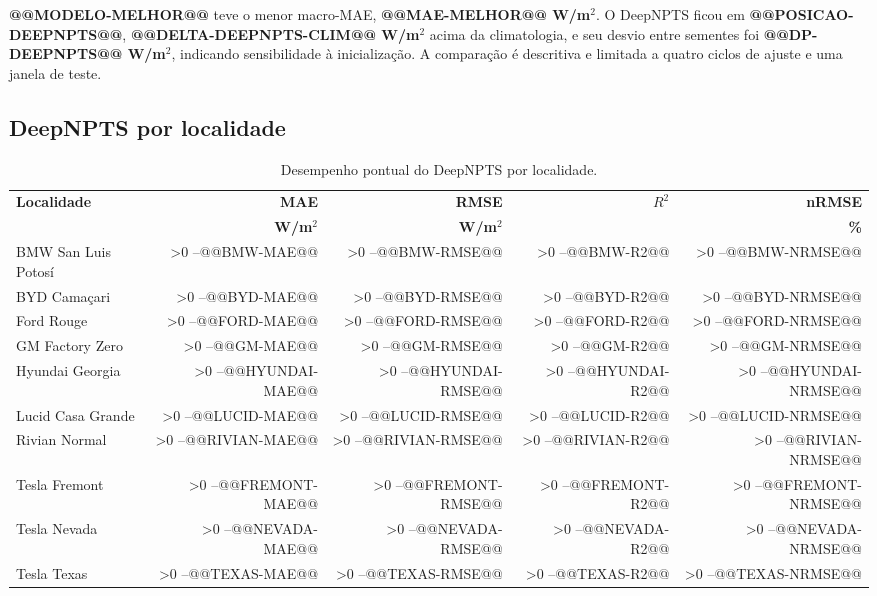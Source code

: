 \documentclass[12pt,a4paper,fleqn]{article}
\makeatletter
\newcommand{\resultado}[1]{%
  \ifnum\pdfmatch{^@@}{\detokenize{#1}}>0 --\else #1\fi}
\makeatother
\begin{document}
\textbf{@@MODELO-MELHOR@@} teve o menor macro-MAE, \textbf{@@MAE-MELHOR@@ W/m$^2$}. O DeepNPTS ficou em \textbf{@@POSICAO-DEEPNPTS@@}, \textbf{@@DELTA-DEEPNPTS-CLIM@@ W/m$^2$} acima da climatologia, e seu desvio entre sementes foi \textbf{@@DP-DEEPNPTS@@ W/m$^2$}, indicando sensibilidade à inicialização. A comparação é descritiva e limitada a quatro ciclos de ajuste e uma janela de teste.

\subsection{DeepNPTS por localidade}

\begin{table}[!ht]
\centering
\caption{Desempenho pontual do DeepNPTS por localidade.}
\label{tab:local}
\setlength{\tabcolsep}{5pt}
\renewcommand{\arraystretch}{1.0}
\begin{tabular}{lrrrr}
\toprule
\textbf{Localidade} & \textbf{MAE} & \textbf{RMSE} & \textbf{$R^2$} & \textbf{nRMSE} \\
 & \textbf{W/m$^2$} & \textbf{W/m$^2$} & & \textbf{\%} \\
\midrule
BMW San Luis Potosí & \resultado{@@BMW-MAE@@} & \resultado{@@BMW-RMSE@@} & \resultado{@@BMW-R2@@} & \resultado{@@BMW-NRMSE@@} \\
BYD Camaçari        & \resultado{@@BYD-MAE@@} & \resultado{@@BYD-RMSE@@} & \resultado{@@BYD-R2@@} & \resultado{@@BYD-NRMSE@@} \\
Ford Rouge          & \resultado{@@FORD-MAE@@} & \resultado{@@FORD-RMSE@@} & \resultado{@@FORD-R2@@} & \resultado{@@FORD-NRMSE@@} \\
GM Factory Zero     & \resultado{@@GM-MAE@@} & \resultado{@@GM-RMSE@@} & \resultado{@@GM-R2@@} & \resultado{@@GM-NRMSE@@} \\
Hyundai Georgia     & \resultado{@@HYUNDAI-MAE@@} & \resultado{@@HYUNDAI-RMSE@@} & \resultado{@@HYUNDAI-R2@@} & \resultado{@@HYUNDAI-NRMSE@@} \\
Lucid Casa Grande   & \resultado{@@LUCID-MAE@@} & \resultado{@@LUCID-RMSE@@} & \resultado{@@LUCID-R2@@} & \resultado{@@LUCID-NRMSE@@} \\
Rivian Normal       & \resultado{@@RIVIAN-MAE@@} & \resultado{@@RIVIAN-RMSE@@} & \resultado{@@RIVIAN-R2@@} & \resultado{@@RIVIAN-NRMSE@@} \\
Tesla Fremont       & \resultado{@@FREMONT-MAE@@} & \resultado{@@FREMONT-RMSE@@} & \resultado{@@FREMONT-R2@@} & \resultado{@@FREMONT-NRMSE@@} \\
Tesla Nevada        & \resultado{@@NEVADA-MAE@@} & \resultado{@@NEVADA-RMSE@@} & \resultado{@@NEVADA-R2@@} & \resultado{@@NEVADA-NRMSE@@} \\
Tesla Texas         & \resultado{@@TEXAS-MAE@@} & \resultado{@@TEXAS-RMSE@@} & \resultado{@@TEXAS-R2@@} & \resultado{@@TEXAS-NRMSE@@} \\
\bottomrule
\end{tabular}
\end{table}
\end{document}

